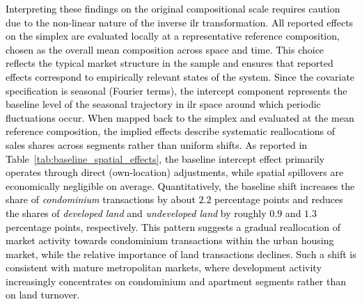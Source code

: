 \documentclass[12pt]{article}
\theoremstyle{plain}
\theoremstyle{definition}
\begin{document}
\textcolor{black}{Interpreting these findings on the original compositional scale requires caution due to the non-linear nature of the inverse ilr transformation. All reported effects on the simplex are evaluated locally at a representative reference composition, chosen as the overall mean composition across space and time. This choice reflects the typical market structure in the sample and ensures that reported effects correspond to empirically relevant states of the system. Since the covariate specification is seasonal (Fourier terms), the intercept component represents the baseline level of the seasonal trajectory in ilr space around which periodic fluctuations occur. When mapped back to the simplex and evaluated at the mean reference composition, the implied effects describe systematic reallocations of sales shares across segments rather than uniform shifts. As reported in Table~\ref{tab:baseline_spatial_effects}, the baseline intercept effect primarily operates through direct (own-location) adjustments, while spatial spillovers are economically negligible on average. Quantitatively, the baseline shift increases the share of \emph{condominium} transactions by about $2.2$ percentage points and reduces the shares of \emph{developed land} and \emph{undeveloped land} by roughly $0.9$ and $1.3$ percentage points, respectively. This pattern suggests a gradual reallocation of market activity towards condominium transactions within the urban housing market, while the relative importance of land transactions declines. Such a shift is consistent with mature metropolitan markets, where development activity increasingly concentrates on condominium and apartment segments rather than on land turnover.}
\end{document}
